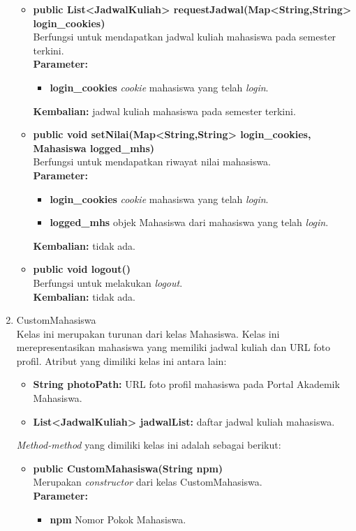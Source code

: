 \begin{enumerate}
\begin{itemize}
			\item \textbf{public List<JadwalKuliah> requestJadwal(Map<String,String> login\_cookies)}\\
				Berfungsi untuk mendapatkan jadwal kuliah mahasiswa pada semester terkini.\\
				\textbf{Parameter:}
				\begin{itemize}
					\item \textbf{login\_cookies} \textit{cookie} mahasiswa yang telah \textit{login}.
				\end{itemize}
				\textbf{Kembalian:} jadwal kuliah mahasiswa pada semester terkini.
				
			\item \textbf{public void setNilai(Map<String,String> login\_cookies, Mahasiswa logged\_mhs)}\\
				Berfungsi untuk mendapatkan riwayat nilai mahasiswa.\\
				\textbf{Parameter:}
				\begin{itemize}
					\item \textbf{login\_cookies} \textit{cookie} mahasiswa yang telah \textit{login}.
					\item \textbf{logged\_mhs} objek Mahasiswa dari mahasiswa yang telah \textit{login}.
				\end{itemize}
				\textbf{Kembalian:} tidak ada.
			
			\item \textbf{public void logout()}\\
				Berfungsi untuk melakukan \textit{logout}.\\
				\textbf{Kembalian:} tidak ada.
		\end{itemize}
		
		\item CustomMahasiswa\\
		Kelas ini merupakan turunan dari kelas Mahasiswa. Kelas ini merepresentasikan mahasiswa yang memiliki jadwal kuliah dan URL foto profil. Atribut yang dimiliki kelas ini antara lain:
		\begin{itemize}
			\item \textbf{String photoPath:}  URL foto profil mahasiswa pada Portal Akademik Mahasiswa.
			\item \textbf{List<JadwalKuliah> jadwalList:} daftar jadwal kuliah mahasiswa.
		\end{itemize}
	\textit{Method-method} yang dimiliki kelas ini adalah sebagai berikut:
		\begin{itemize}
			\item \textbf{public CustomMahasiswa(String npm)}\\
			Merupakan \textit{constructor} dari kelas CustomMahasiswa.\\
			\textbf{Parameter:}
			\begin{itemize}
				\item \textbf{npm} Nomor Pokok Mahasiswa.
			\end{itemize}
		\end{itemize}
		

\end{enumerate}
